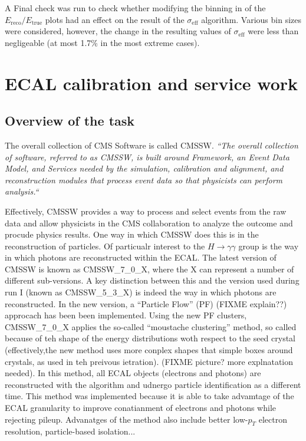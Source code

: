 \documentclass[10pt]{article}
\begin{document}
A Final check was run to check whether modifying the binning in of the $E_{\text{reco}}/E_{\text{true}}$ plots had an effect on the result of the $\sigma_{\text{eff}}$ algorithm. Various bin sizes were considered, however, the change in the resulting values of $\sigma_{\text{eff}}$ were less than negligeable (at most 1.7\% in the most extreme cases).





\newpage


\section{ECAL calibration and service work}
\subsection{Overview of the task}

The overall collection of CMS Software is called CMSSW. \textit{``The overall collection of software, referred to as CMSSW, is built around Framework, an Event Data Model, and Services needed by the simulation, calibration and alignment, and reconstruction modules that process event data so that physicists can perform analysis.``}~\cite{CMSSW}

Effectively, CMSSW provides a way to process and select events from the raw data and allow physicists in the CMS collaboration to analyze the outcome and procude physics results. One way in which CMSSW does this is in the reconstruction of particles. Of particualr interest to the $H \rightarrow \gamma \gamma$ group is the way in which photons are reconstructed within the ECAL. The latest version of CMSSW is known as CMSSW\_7\_0\_X, where the X can represent a number of different sub-versions. A key distinction between this and the version used during run I (known as CMSSW\_5\_3\_X) is indeed the way in which photons are reconstructed. In the new version, a ``Particle Flow'' (PF) (FIXME explain??) approcach has been been implemented. Using the new PF clusters, CMSSW\_7\_0\_X applies the so-called ``moustache clustering'' method, so called because of teh shape of the energy distributions woth respect to the seed crystal (effectively,the new method uses more conplex shapes that simple boxes around crystals, as used in teh preivous ietration). (FIXME picture? more explnatation needed). In this method, all ECAL objects (electrons and photons) are reconstructed with the algorithm and udnergo particle identification as a different time. This method was implemented because it is able to take advamtage of the ECAL granularity to improve conatianment of electrons and photons while rejecting pileup. Advanatges of the method also include better low-$p_T$ electron resolution, particle-based isolation... 
\end{document}
